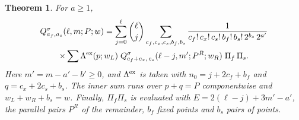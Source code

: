 \documentclass[11pt,a4paper]{article}
\newtheorem{theorem}{Theorem}[section]
\theoremstyle{definition}
\begin{document}
\begin{theorem}\label{thm:symrec}
For $a\ge1$,
\begin{multline}\label{eq:symrec}
Q^\sigma_{a_f,a_s}(\ell,m;P;w)=\sum_{j=0}^{\ell}\binom{\ell}{j}\sum_{c_f,c_x,c_s,b_f,b_s}\frac{1}{c_f!\,c_x!\,c_s!\,b_f!\,b_s!\,2^{b_s}\,2^{a'}}\\
\times\sum\Lambda^{\rm ex}(p;w_L)\;Q^\sigma_{c_f+c_x,\,c_s}(\ell-j,m';P^R;w_R)\;\Pi_f\,\Pi_s .
\end{multline}
Here $m'=m-a'-b'\ge0$, and $\Lambda^{\rm ex}$ is taken with $n_0=j+2c_f+b_f$ and $q=c_x+2c_s+b_s$. The inner sum runs over $p+q=P$ componentwise and $w_L+w_R+b_s=w$. Finally, $\Pi_f\Pi_s$ is evaluated with $E=2(\ell-j)+3m'-a'$, the parallel pairs $P^R$ of the remainder, $b_f$ fixed points and $b_s$ pairs of points.
\end{theorem}
\end{document}
